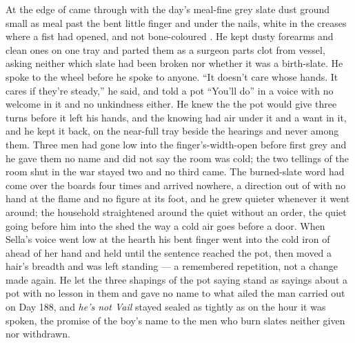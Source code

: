 \scenebreak

At the edge of   came through with the day's meal-fine grey slate dust ground small as meal past the bent little finger and under the nails, white in the creases where a fist had opened, and not bone-coloured . He kept dusty forearms and clean ones on one tray and parted them as a surgeon parts clot from vessel, asking neither which slate had been broken nor whether it was a birth-slate. He spoke to the wheel before he spoke to anyone. “It doesn't care whose hands. It cares if they're steady,” he said, and told a pot “You'll do” in a voice with no welcome in it and no unkindness either. He knew the  the pot would give three turns before it left his hands, and the knowing had air under it and a want in it, and he kept it back, on the near-full tray beside the hearings and never among them. Three men had gone low into the finger's-width-open  before first grey and he gave them no name and did not say the room was cold; the two tellings of the room shut in the war stayed two and no third came. The burned-slate word had come over the boards four times and arrived nowhere, a direction out of  with no hand at the flame and no figure at its foot, and he grew quieter whenever it went around; the household straightened around the quiet without an order, the quiet going before him into the shed the way a cold air goes before a door. When Sella's voice went low at the hearth his bent finger went into the cold iron of  ahead of her hand and held until the sentence reached the pot, then moved a hair's breadth and was left standing --- a remembered repetition, not a change made again. He let the three shapings of the pot saying stand as sayings about a pot with no lesson in them and gave no name to what ailed the man carried out on Day 188, and \emph{he's not Vail} stayed sealed as tightly as on the hour it was spoken, the promise of the boy's name to the men who burn slates neither given nor withdrawn.

